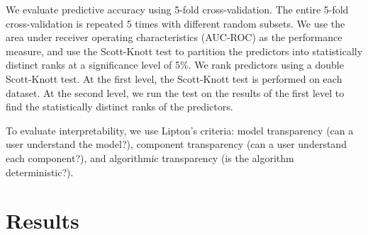 \documentclass[sigconf]{acmart}
\begin{document}
We evaluate predictive accuracy using 5-fold cross-validation. The entire 5-fold cross-validation is repeated 5 times with different random subsets. We use the area under receiver operating characteristics (AUC-ROC) as the performance measure, and use the Scott-Knott test to partition the predictors into statistically distinct ranks at a significance level of 5\%. We rank predictors using a double Scott-Knott test. At the first level, the Scott-Knott test is performed on each dataset. At the second level, we run the test on the results of the first level to find the statistically distinct ranks of the predictors.

To evaluate interpretability, we use Lipton's criteria: model transparency (can a user understand the model?), component transparency (can a user understand each component?), and algorithmic transparency (is the algorithm deterministic?).

\section{Results}



\end{document}
